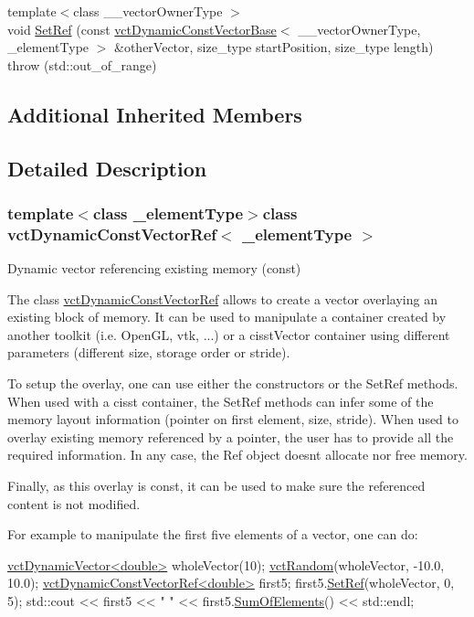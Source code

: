 \begin{DoxyCompactItemize}
\item 
{\footnotesize template$<$class \+\_\+\+\_\+vector\+Owner\+Type $>$ }\\void \hyperlink{classvct_dynamic_const_vector_ref_a5e6cc77f6629acd36a60ea3d97a1c67b}{Set\+Ref} (const \hyperlink{classvct_dynamic_const_vector_base}{vct\+Dynamic\+Const\+Vector\+Base}$<$ \+\_\+\+\_\+vector\+Owner\+Type, \+\_\+element\+Type $>$ \&other\+Vector, size\+\_\+type start\+Position, size\+\_\+type length)  throw (std\+::out\+\_\+of\+\_\+range)
\end{DoxyCompactItemize}
\subsection*{Additional Inherited Members}


\subsection{Detailed Description}
\subsubsection*{template$<$class \+\_\+element\+Type$>$class vct\+Dynamic\+Const\+Vector\+Ref$<$ \+\_\+element\+Type $>$}

Dynamic vector referencing existing memory (const) 

The class \hyperlink{classvct_dynamic_const_vector_ref}{vct\+Dynamic\+Const\+Vector\+Ref} allows to create a vector overlaying an existing block of memory. It can be used to manipulate a container created by another toolkit (i.\+e. Open\+G\+L, vtk, ...) or a cisst\+Vector container using different parameters (different size, storage order or stride).

To setup the overlay, one can use either the constructors or the Set\+Ref methods. When used with a cisst container, the Set\+Ref methods can infer some of the memory layout information (pointer on first element, size, stride). When used to overlay existing memory referenced by a pointer, the user has to provide all the required information. In any case, the Ref object doesn\textquotesingle{}t allocate nor free memory.

Finally, as this overlay is const, it can be used to make sure the referenced content is not modified.

For example to manipulate the first five elements of a vector, one can do\+: 
\begin{DoxyCode}
\hyperlink{classvct_dynamic_vector}{vctDynamicVector<double>} wholeVector(10);
\hyperlink{group__cisst_vector_ga0d25660a2dc6ef9c093f6f6b2804d2d0}{vctRandom}(wholeVector, -10.0, 10.0);
\hyperlink{classvct_dynamic_const_vector_ref}{vctDynamicConstVectorRef<double>} first5;
first5.\hyperlink{classvct_dynamic_const_vector_ref_a25ea281066863d915ea0bd65092d94b5}{SetRef}(wholeVector, 0, 5);
std::cout << first5 << \textcolor{stringliteral}{" "} << first5.\hyperlink{classvct_dynamic_const_vector_base_a8a06cb87f0416634404a756b08884d65}{SumOfElements}() << std::endl;
\end{DoxyCode}


